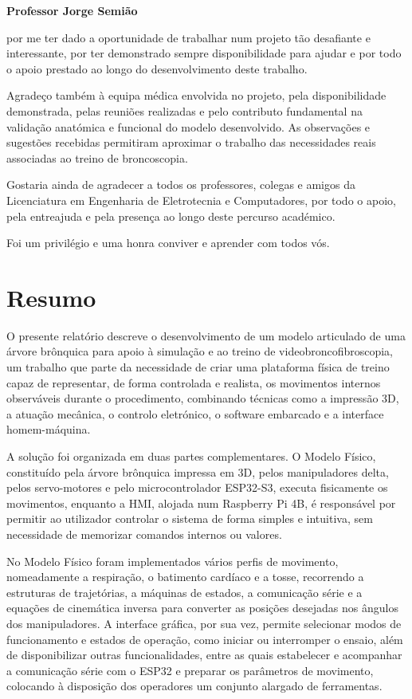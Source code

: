 \documentclass[12pt,a4paper,oneside]{report}
\begin{document}
\begin{center}
\textbf{Professor Jorge Semião}
\end{center}

por me ter dado a oportunidade de trabalhar num projeto tão desafiante e interessante, por ter demonstrado sempre disponibilidade para ajudar e por todo o apoio prestado ao longo do desenvolvimento deste trabalho.

Agradeço também à equipa médica envolvida no projeto, pela disponibilidade demonstrada, pelas reuniões realizadas e pelo contributo fundamental na validação anatómica e funcional do modelo desenvolvido. As observações e sugestões recebidas permitiram aproximar o trabalho das necessidades reais associadas ao treino de broncoscopia.

Gostaria ainda de agradecer a todos os professores, colegas e amigos da Licenciatura em Engenharia de Eletrotecnia e Computadores, por todo o apoio, pela entreajuda e pela presença ao longo deste percurso académico.

Foi um privilégio e uma honra conviver e aprender com todos vós.

\chapter*{Resumo}
O presente relatório descreve o desenvolvimento de um modelo articulado de uma árvore brônquica para apoio à simulação e ao treino de videobroncofibroscopia, um trabalho que parte da necessidade de criar uma plataforma física de treino capaz de representar, de forma controlada e realista, os movimentos internos observáveis durante o procedimento, combinando técnicas como a impressão 3D, a atuação mecânica, o controlo eletrónico, o software embarcado e a interface homem-máquina.

A solução foi organizada em duas partes complementares. O Modelo Físico, constituído pela árvore brônquica impressa em 3D, pelos manipuladores delta, pelos servo-motores e pelo microcontrolador ESP32-S3, executa fisicamente os movimentos, enquanto a HMI, alojada num Raspberry Pi 4B, é responsável por permitir ao utilizador controlar o sistema de forma simples e intuitiva, sem necessidade de memorizar comandos internos ou valores.

No Modelo Físico foram implementados vários perfis de movimento, nomeadamente a respiração, o batimento cardíaco e a tosse, recorrendo a estruturas de trajetórias, a máquinas de estados, a comunicação série e a equações de cinemática inversa para converter as posições desejadas nos ângulos dos manipuladores. A interface gráfica, por sua vez, permite selecionar modos de funcionamento e estados de operação, como iniciar ou interromper o ensaio, além de disponibilizar outras funcionalidades, entre as quais estabelecer e acompanhar a comunicação série com o ESP32 e preparar os parâmetros de movimento, colocando à disposição dos operadores um conjunto alargado de ferramentas.
\end{document}
